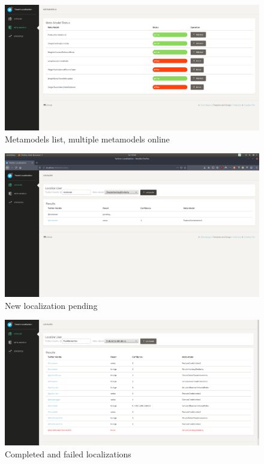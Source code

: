 \documentclass[10pt,a4paper]{article}
\begin{document}
\begin{figure}
	\centering
	\includegraphics[scale=0.20]{metamodels-built}
	\caption{Metamodels list, multiple metamodels online}
	\label{fig:metamodels-built}
\end{figure}

\begin{figure}
	\centering
	\includegraphics[scale=0.20]{localize-one-pending}
	\caption{New localization pending}
	\label{fig:localize-one-pending}
\end{figure}

\begin{figure}
	\centering
	\includegraphics[scale=0.20]{localize-many-results}
	\caption{Completed and failed localizations}
	\label{fig:localize-many-results}
\end{figure}
\end{document}
